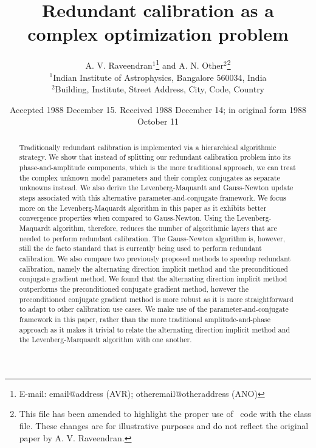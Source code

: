 \documentclass[useAMS,usenatbib]{mn2e}
\title[Unknown]{Redundant calibration as a complex optimization problem}
\author[A. V. Raveendran and A. N. Other]{A. V. Raveendran$^{1}$\thanks{E-mail:
email@address (AVR); otheremail@otheraddress (ANO)} and A. N.
Other$^{2}$\footnotemark[1]\thanks{This file has been amended to
highlight the proper use of \LaTeXe\ code with the class file.
These changes are for illustrative purposes and do not reflect the
original paper by A. V. Raveendran.}\\
$^{1}$Indian Institute of Astrophysics, Bangalore 560034, India\\
$^{2}$Building, Institute, Street Address, City, Code, Country}
\begin{document}
\date{Accepted 1988 December 15. Received 1988 December 14; in original form 1988 October 11}

\pagerange{\pageref{firstpage}--\pageref{lastpage}} 

\maketitle

\label{firstpage}

\begin{abstract}
Traditionally redundant calibration is implemented via a hierarchical algorithmic strategy.  
We show that instead of splitting our redundant calibration problem into its phase-and-amplitude components,
which is the more traditional approach, we can treat the complex unknown model parameters and their complex conjugates as separate unknowns instead. 
We also derive the Levenberg-Maquardt and Gauss-Newton update steps associated with this alternative parameter-and-conjugate framework.
We focus more on the Levenberg-Maquardt algorithm in this paper as it exhibits better convergence properties when compared to Gauss-Newton.
Using the Levenberg-Maquardt algorithm, therefore, reduces the number of algorithmic layers that are needed to perform redundant calibration.
The Gauss-Newton algorithm is, however, still the de facto standard that is currently being used to perform redundant calibration.
We also compare two previously proposed methods to speedup redundant calibration, namely the alternating direction implicit method and the preconditioned conjugate gradient method. We found that the alternating 
direction implicit method outperforms the preconditioned conjugate gradient method, however the preconditioned conjugate gradient method is more robust as it is more straightforward to adapt to other calibration use cases. 
We make use of the parameter-and-conjugate framework in this paper, rather than the more traditional amplitude-and-phase approach as it makes it trivial to relate the alternating direction implicit method 
and the Levenberg-Marquardt algorithm with one another.
\end{abstract}

\end{document}
